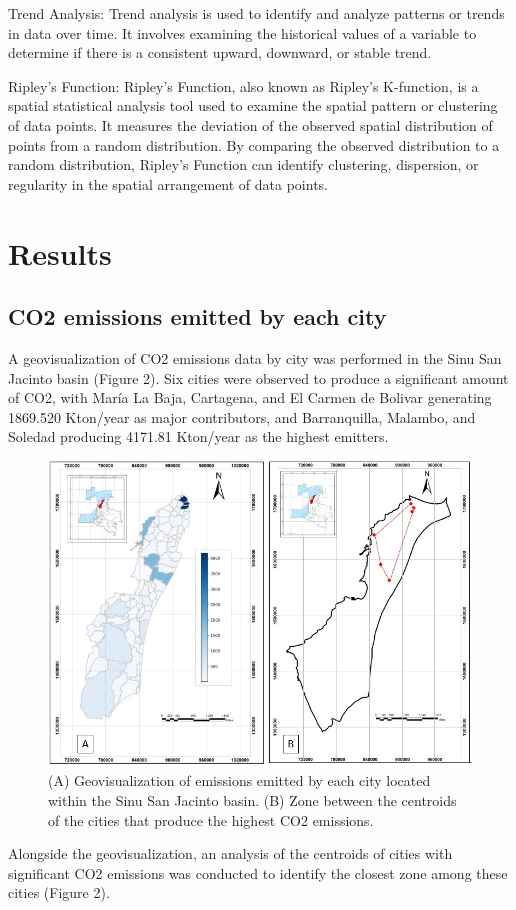 \documentclass{ifacconf}
\begin{document}
Trend Analysis: Trend analysis is used to identify and analyze patterns or trends in data over time. It involves examining the historical values of a variable to determine if there is a consistent upward, downward, or stable trend.

Ripley's Function: Ripley's Function, also known as Ripley's K-function, is a spatial statistical analysis tool used to examine the spatial pattern or clustering of data points. It measures the deviation of the observed spatial distribution of points from a random distribution. By comparing the observed distribution to a random distribution, Ripley's Function can identify clustering, dispersion, or regularity in the spatial arrangement of data points. 

\section{Results}
\subsection{CO2 emissions emitted by each city}
A geovisualization of CO2 emissions data by city was performed in the Sinu San Jacinto basin (Figure 2). Six cities were observed to produce a significant amount of CO2, with María La Baja, Cartagena, and El Carmen de Bolivar generating 1869.520 Kton/year as major contributors, and Barranquilla, Malambo, and Soledad producing 4171.81 Kton/year as the highest emitters.

\begin{figure}[h]
	\centering
	\includegraphics[width=1\linewidth]{img/Emisiones}
	\caption[Emisiones]{(A) Geovisualization of emissions emitted by each city located within the Sinu San Jacinto basin. (B) Zone between the centroids of the cities that produce the highest CO2 emissions.}
	\label{fig:emisiones}
\end{figure}
Alongside the geovisualization, an analysis of the centroids of cities with significant CO2 emissions was conducted to identify the closest zone among these cities (Figure 2).
\end{document}
